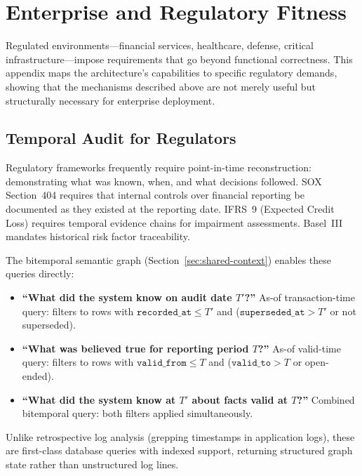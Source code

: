 \documentclass[11pt]{article}
\begin{document}
\section{Enterprise and Regulatory Fitness}
\label{sec:enterprise}

Regulated environments---financial services, healthcare, defense, critical infrastructure---impose requirements that go beyond functional correctness. This appendix maps the architecture's capabilities to specific regulatory demands, showing that the mechanisms described above are not merely useful but structurally necessary for enterprise deployment.

\subsection{Temporal Audit for Regulators}

Regulatory frameworks frequently require point-in-time reconstruction: demonstrating what was known, when, and what decisions followed. SOX Section~404 requires that internal controls over financial reporting be documented as they existed at the reporting date. IFRS~9 (Expected Credit Loss) requires temporal evidence chains for impairment assessments. Basel~III mandates historical risk factor traceability.

The bitemporal semantic graph (Section~\ref{sec:shared-context}) enables these queries directly:

\begin{itemize}
  \item \textbf{``What did the system know on audit date $T'$?''} As-of transaction-time query: filters to rows with $\texttt{recorded\_at} \leq T'$ and ($\texttt{superseded\_at} > T'$ or not superseded).
  \item \textbf{``What was believed true for reporting period $T$?''} As-of valid-time query: filters to rows with $\texttt{valid\_from} \leq T$ and ($\texttt{valid\_to} > T$ or open-ended).
  \item \textbf{``What did the system know at $T'$ about facts valid at $T$?''} Combined bitemporal query: both filters applied simultaneously.
\end{itemize}

Unlike retrospective log analysis (grepping timestamps in application logs), these are first-class database queries with indexed support, returning structured graph state rather than unstructured log lines.
\end{document}
